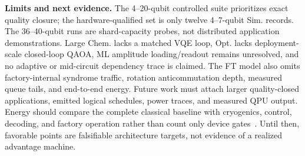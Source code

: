\noindent\textbf{Limits and next evidence.}
The 4--20-qubit controlled suite prioritizes exact quality closure; the hardware-qualified set is only twelve 4--7-qubit Sim. records. The 36--40-qubit runs are shard-capacity probes, not distributed application demonstrations. Large Chem. lacks a matched VQE loop, Opt. lacks deployment-scale closed-loop QAOA, ML amplitude loading/readout remains unresolved, and no adaptive or mid-circuit dependency trace is claimed. The FT model also omits factory-internal syndrome traffic, rotation anticommutation depth, measured queue tails, and end-to-end energy. Future work must attach larger quality-closed applications, emitted logical schedules, power traces, and measured QPU output. Energy should compare the complete classical baseline with cryogenics, control, decoding, and factory operation rather than count only device gates~\cite{auffeves2022energy,fellousasiani2023fullstack}. Until then, favorable points are falsifiable architecture targets, not evidence of a realized advantage machine.
